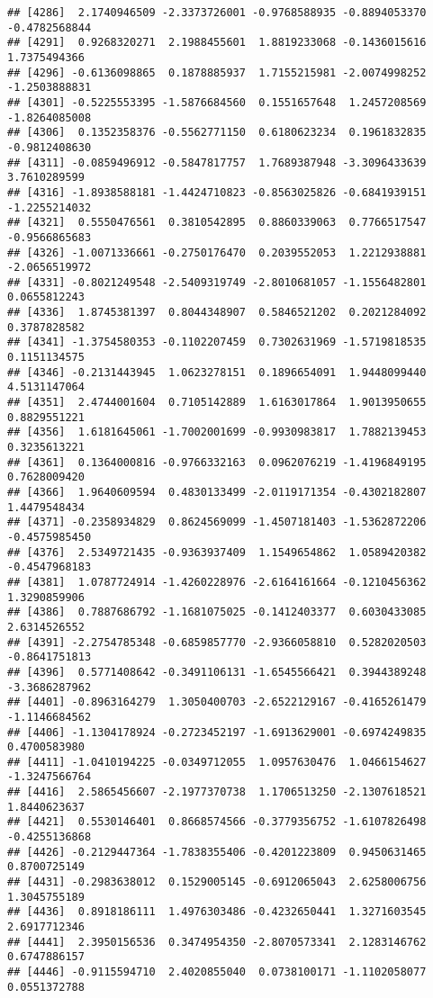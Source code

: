 \documentclass[
]{article}
\begin{document}
\begin{verbatim}
## [4286]  2.1740946509 -2.3373726001 -0.9768588935 -0.8894053370 -0.4782568844
## [4291]  0.9268320271  2.1988455601  1.8819233068 -0.1436015616  1.7375494366
## [4296] -0.6136098865  0.1878885937  1.7155215981 -2.0074998252 -1.2503888831
## [4301] -0.5225553395 -1.5876684560  0.1551657648  1.2457208569 -1.8264085008
## [4306]  0.1352358376 -0.5562771150  0.6180623234  0.1961832835 -0.9812408630
## [4311] -0.0859496912 -0.5847817757  1.7689387948 -3.3096433639  3.7610289599
## [4316] -1.8938588181 -1.4424710823 -0.8563025826 -0.6841939151 -1.2255214032
## [4321]  0.5550476561  0.3810542895  0.8860339063  0.7766517547 -0.9566865683
## [4326] -1.0071336661 -0.2750176470  0.2039552053  1.2212938881 -2.0656519972
## [4331] -0.8021249548 -2.5409319749 -2.8010681057 -1.1556482801  0.0655812243
## [4336]  1.8745381397  0.8044348907  0.5846521202  0.2021284092  0.3787828582
## [4341] -1.3754580353 -0.1102207459  0.7302631969 -1.5719818535  0.1151134575
## [4346] -0.2131443945  1.0623278151  0.1896654091  1.9448099440  4.5131147064
## [4351]  2.4744001604  0.7105142889  1.6163017864  1.9013950655  0.8829551221
## [4356]  1.6181645061 -1.7002001699 -0.9930983817  1.7882139453  0.3235613221
## [4361]  0.1364000816 -0.9766332163  0.0962076219 -1.4196849195  0.7628009420
## [4366]  1.9640609594  0.4830133499 -2.0119171354 -0.4302182807  1.4479548434
## [4371] -0.2358934829  0.8624569099 -1.4507181403 -1.5362872206 -0.4575985450
## [4376]  2.5349721435 -0.9363937409  1.1549654862  1.0589420382 -0.4547968183
## [4381]  1.0787724914 -1.4260228976 -2.6164161664 -0.1210456362  1.3290859906
## [4386]  0.7887686792 -1.1681075025 -0.1412403377  0.6030433085  2.6314526552
## [4391] -2.2754785348 -0.6859857770 -2.9366058810  0.5282020503 -0.8641751813
## [4396]  0.5771408642 -0.3491106131 -1.6545566421  0.3944389248 -3.3686287962
## [4401] -0.8963164279  1.3050400703 -2.6522129167 -0.4165261479 -1.1146684562
## [4406] -1.1304178924 -0.2723452197 -1.6913629001 -0.6974249835  0.4700583980
## [4411] -1.0410194225 -0.0349712055  1.0957630476  1.0466154627 -1.3247566764
## [4416]  2.5865456607 -2.1977370738  1.1706513250 -2.1307618521  1.8440623637
## [4421]  0.5530146401  0.8668574566 -0.3779356752 -1.6107826498 -0.4255136868
## [4426] -0.2129447364 -1.7838355406 -0.4201223809  0.9450631465  0.8700725149
## [4431] -0.2983638012  0.1529005145 -0.6912065043  2.6258006756  1.3045755189
## [4436]  0.8918186111  1.4976303486 -0.4232650441  1.3271603545  2.6917712346
## [4441]  2.3950156536  0.3474954350 -2.8070573341  2.1283146762  0.6747886157
## [4446] -0.9115594710  2.4020855040  0.0738100171 -1.1102058077  0.0551372788

\end{verbatim}
\end{document}
